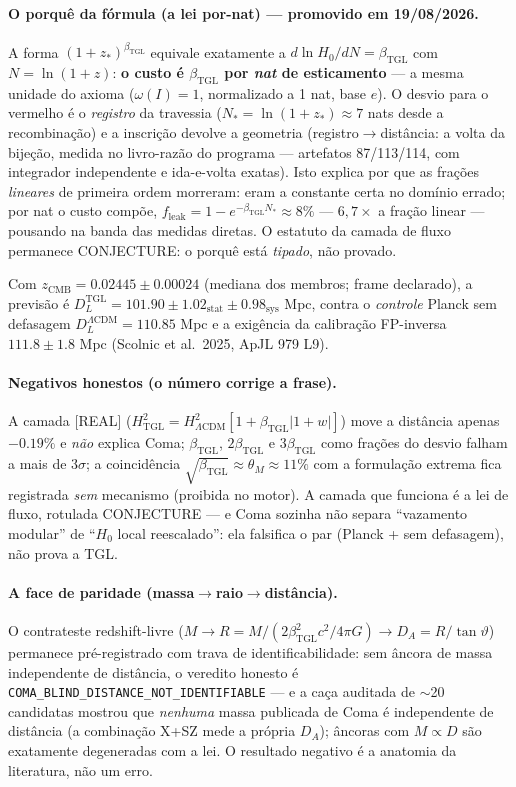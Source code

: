 \documentclass[11pt]{article}
\newcommand{\bTGL}{\beta_{\mathrm{TGL}}}\newcommand{\Msun}{M_{\odot}}\newcommand{\TGL}{\mathrm{TGL}}
\theoremstyle{definition}\newtheorem{deriv}{Derivação}
\begin{document}
\paragraph{O porquê da fórmula (a lei por-nat) --- promovido em 19/08/2026.} A forma $(1+z_*)^{\bTGL}$ equivale exatamente a $d\ln H_0/dN=\bTGL$ com $N=\ln(1+z)$: \textbf{o custo é $\bTGL$ por \emph{nat} de esticamento} --- a mesma unidade do axioma ($\omega(I)=1$, normalizado a 1 nat, base $e$). O desvio para o vermelho é o \emph{registro} da travessia ($N_*=\ln(1+z_*)\approx 7$ nats desde a recombinação) e a inscrição devolve a geometria (registro$\to$distância: a volta da bijeção, medida no livro-razão do programa --- artefatos 87/113/114, com integrador independente e ida-e-volta exatas). Isto explica por que as frações \emph{lineares} de primeira ordem morreram: eram a constante certa no domínio errado; por nat o custo compõe, $f_{\mathrm{leak}}=1-e^{-\bTGL N_*}\approx 8\%$ --- $6{,}7\times$ a fração linear --- pousando na banda das medidas diretas. O estatuto da camada de fluxo permanece \textsf{CONJECTURE}: o porquê está \emph{tipado}, não provado.

Com $z_{\mathrm{CMB}}=0.02445\pm0.00024$ (mediana dos membros; frame declarado), a previsão é $D_L^{\mathrm{TGL}}=101.90\pm1.02_{\mathrm{stat}}\pm0.98_{\mathrm{sys}}$ Mpc, contra o \emph{controle} Planck sem defasagem $D_L^{\Lambda\mathrm{CDM}}=110.85$ Mpc e a exigência da calibração FP-inversa $111.8\pm1.8$ Mpc (Scolnic et al.\ 2025, ApJL 979 L9).

\paragraph{Negativos honestos (o número corrige a frase).} A camada [REAL] ($H^2_{\mathrm{TGL}}=H^2_{\Lambda\mathrm{CDM}}[1+\bTGL|1+w|]$) move a distância apenas $-0.19\%$ e \emph{não} explica Coma; $\bTGL$, $2\bTGL$ e $3\bTGL$ como frações do desvio falham a mais de $3\sigma$; a coincidência $\sqrt{\bTGL}\approx\theta_M\approx11\%$ com a formulação extrema fica registrada \emph{sem} mecanismo (proibida no motor). A camada que funciona é a lei de fluxo, rotulada \textsf{CONJECTURE} --- e Coma sozinha não separa ``vazamento modular'' de ``$H_0$ local reescalado'': ela falsifica o par (Planck + sem defasagem), não prova a TGL.

\paragraph{A face de paridade (massa$\to$raio$\to$distância).} O contrateste redshift-livre ($M\to R=M/(2\bTGL^2 c^2/4\pi G)\to D_A=R/\tan\vartheta$) permanece pré-registrado com trava de identificabilidade: sem âncora de massa independente de distância, o veredito honesto é \texttt{COMA\_BLIND\_DISTANCE\_NOT\_IDENTIFIABLE} --- e a caça auditada de $\sim$20 candidatas mostrou que \emph{nenhuma} massa publicada de Coma é independente de distância (a combinação X+SZ mede a própria $D_A$); âncoras com $M\propto D$ são exatamente degeneradas com a lei. O resultado negativo é a anatomia da literatura, não um erro.
\end{document}
